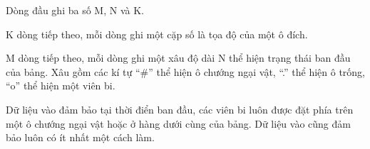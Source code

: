 Dòng đầu ghi ba số M, N và K.

K dòng tiếp theo, mỗi dòng ghi một cặp số là tọa độ của một ô đích.

M dòng tiếp theo, mỗi dòng ghi một xâu độ dài N thể hiện trạng thái ban đầu của bảng. Xâu gồm các kí tự “\#” thể hiện ô chướng ngại vật, “.” thể hiện ô trống, “o” thể hiện một viên bi.

Dữ liệu vào đảm bảo tại thời điển ban đầu, các viên bi luôn được đặt phía trên một ô chướng ngại vật hoặc ở hàng dưới cùng của bảng. Dữ liệu vào cũng đảm bảo luôn có ít nhất một cách làm.